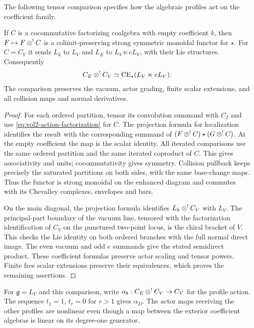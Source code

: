 The following tensor comparison specifies how the algebraic profiles
act on the coefficient family.

\begin{lemma}\label{lem:vol2-strong-boundary-tensor}
If $C$ is a cocommutative factorizing coalgebra with empty
coefficient $k$, then $F\mapsto F\mathbin{\otimes^!} C$ is a colimit-preserving
strong symmetric monoidal functor for $\star$. For $C=C_V$ it
sends $L_k$ to $L_V$ and $L_E$ to $L_V\ltimes eL_V$, with their
Lie structures. Consequently
\begin{equation}\label{eq:vol2-exterior-comparison}
 C_E\mathbin{\otimes^!} C_V\simeq\operatorname{CE}_{\star}(L_V\ltimes eL_V).
\end{equation}
The comparison preserves the vacuum, actor grading, finite scalar
extensions, and all collision maps and normal derivatives.
\end{lemma}

\begin{proof}
For each ordered partition, tensor its convolution summand with
$C_I$ and use \eqref{eq:vol2-action-factorization} for $C$.
The projection formula for localization identifies the result with
the corresponding summand of
$(F\mathbin{\otimes^!} C)\star(G\mathbin{\otimes^!} C)$. At the empty coefficient the map is
the scalar identity. All iterated comparisons use the same ordered
partition and the same iterated coproduct of $C$. This gives
associativity and units; cocommutativity gives symmetry. Collision
pullback keeps precisely the saturated partitions on both sides,
with the same base-change maps. Thus the functor is strong monoidal
on the enhanced diagram and commutes with its Chevalley complexes,
envelopes and bars.

On the main diagonal, the projection formula identifies
$L_k\mathbin{\otimes^!} C_V$ with $L_V$. The principal-part boundary of the vacuum
line, tensored with the factorization identification of $C_V$ on the
punctured two-point locus, is the chiral bracket of $V$. This checks
the Lie identity on both ordered branches with the full normal
direct image. The even vacuum and odd $e$ summands give the stated
semidirect product. These coefficient formulas preserve actor
scaling and tensor powers. Finite free scalar extensions preserve
their equivalences, which proves the remaining assertions.
\end{proof}

For $\mathfrak g=L_V$ and this comparison, write
$\alpha_{\mathbf t}:C_E\mathbin{\otimes^!} C_V\to C_V$ for the profile action.
The sequence $t_1=1$, $t_r=0$ for $r>1$ gives $\alpha_D$.
The actor maps receiving the other profiles are nonlinear even
though a map between the exterior coefficient algebras is linear
on its degree-one generator.

